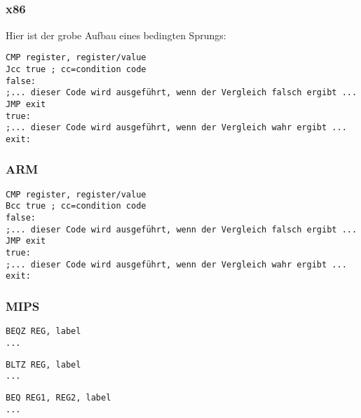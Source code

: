\label{sec:Jcc}






\subsection{\Conclusion{}}

\subsubsection{x86}

Hier ist der grobe Aufbau eines bedingten Sprungs:

\begin{lstlisting}[caption=x86,style=customasmx86]
CMP register, register/value
Jcc true ; cc=condition code
false:
;... dieser Code wird ausgeführt, wenn der Vergleich falsch ergibt ...
JMP exit 
true:
;... dieser Code wird ausgeführt, wenn der Vergleich wahr ergibt ...
exit:
\end{lstlisting}

\subsubsection{ARM}

\begin{lstlisting}[caption=ARM,style=customasmARM]
CMP register, register/value
Bcc true ; cc=condition code
false:
;... dieser Code wird ausgeführt, wenn der Vergleich falsch ergibt ...
JMP exit 
true:
;... dieser Code wird ausgeführt, wenn der Vergleich wahr ergibt ...
exit:
\end{lstlisting}

\subsubsection{MIPS}

\begin{lstlisting}[caption=prüfe auf Null,style=customasmMIPS]
BEQZ REG, label
...
\end{lstlisting}
\begin{lstlisting}[caption=Prüfe auf kleiner Null,style=customasmMIPS]
BLTZ REG, label
...
\end{lstlisting}

\begin{lstlisting}[caption=Prüfe auf Gleichheit,style=customasmMIPS]
BEQ REG1, REG2, label
...
\end{lstlisting}

